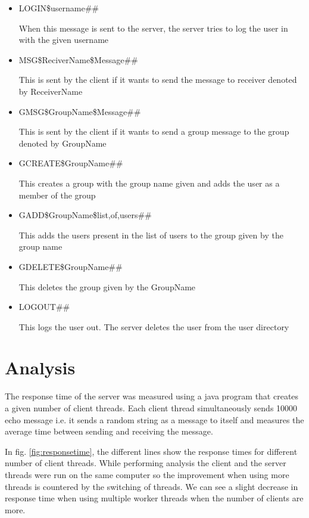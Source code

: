 \documentclass{article}
\begin{document}
\begin{itemize}
	\item LOGIN\$username\#\#

		When this message is sent to the server, the server tries to log the user in with the given username

	\item MSG\$ReciverName\$Message\#\#

		This is sent by the client if it wants to send the message to receiver denoted by ReceiverName
	\item GMSG\$GroupName\$Message\#\#

		This is sent by the client if it wants to send a group message to the group denoted by GroupName

	\item GCREATE\$GroupName\#\#

		This creates a group with the group name given and adds the user as a member of the group

	\item GADD\$GroupName\$list,of,users\#\#

		This adds the users present in the list of users to the group given by the group name

	\item GDELETE\$GroupName\#\#

		This deletes the group given by the GroupName

	\item LOGOUT\#\#

		This logs the user out. The server deletes the user from the user directory
\end{itemize}

\section{Analysis}

The response time of the server was measured using a java program that creates a given number of client threads. Each client thread simultaneously sends 10000 echo message i.e. it sends a random string as a message to itself and measures the average time between sending and receiving the message.

In fig. \ref{fig:responsetime}, the different lines show the response times for different number of client threads. 
While performing analysis the client and the server threads were run on the same computer so the improvement when using more threads is countered by the switching of threads.
We can see a slight decrease in response time when using multiple worker threads when the number of clients are more.
\end{document}
